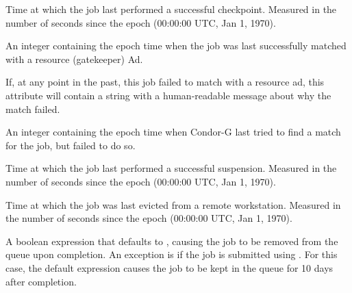 \begin{description}
\item[\AdAttr{LastCkptTime}:]  Time at which the job last performed a
successful checkpoint.  Measured in the number of seconds since the
epoch (00:00:00 UTC, Jan 1, 1970).

\item[\AdAttr{LastMatchTime}:]  An integer containing the epoch time
when the job was last successfully matched with a resource (gatekeeper) Ad.

\item[\AdAttr{LastRejMatchReason}:]   If, at any point in the past,
this job failed to match with a resource ad,
this attribute will contain a string with a
human-readable message about why the match failed.

\item[\AdAttr{LastRejMatchTime}:]   An integer containing the epoch
time when Condor-G last tried to find a match for the job,
but failed to do so.

\item[\AdAttr{LastSuspensionTime}:]  Time at which the job last performed a
successful suspension.  Measured in the number of seconds since the
epoch (00:00:00 UTC, Jan 1, 1970).

\item[\AdAttr{LastVacateTime}:]  Time at which the job was last
evicted from a remote workstation.  Measured in the number of seconds
since the epoch (00:00:00 UTC, Jan 1, 1970).

\item[\AdAttr{LeaveJobInQueue}:]  A boolean expression that defaults to
, causing the job to be removed from the queue upon completion.
An exception is if the job is submitted using .
For this case, the default expression causes the job to be kept in the queue
for 10 days after completion.


\end{description}
